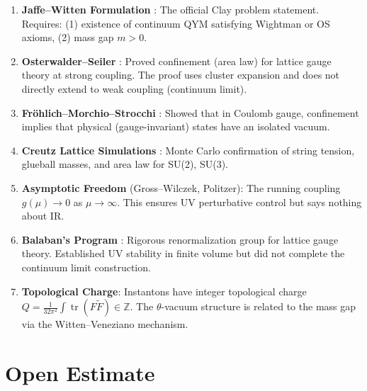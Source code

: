 \documentclass[11pt]{article}
\theoremstyle{definition}
\DeclareMathOperator{\tr}{tr}
\begin{document}
\begin{enumerate}
  \item \textbf{Jaffe--Witten Formulation} \cite{JW}: The official Clay problem statement.
    Requires: (1) existence of continuum QYM satisfying Wightman or OS axioms,
    (2) mass gap $m > 0$.

  \item \textbf{Osterwalder--Seiler} \cite{OS}: Proved confinement (area law)
    for lattice gauge theory at strong coupling.  The proof uses cluster expansion
    and does not directly extend to weak coupling (continuum limit).

  \item \textbf{Fr\"ohlich--Morchio--Strocchi} \cite{FMS}: Showed that in
    Coulomb gauge, confinement implies that physical (gauge-invariant) states
    have an isolated vacuum.

  \item \textbf{Creutz Lattice Simulations} \cite{Creutz}: Monte Carlo confirmation
    of string tension, glueball masses, and area law for SU(2), SU(3).

  \item \textbf{Asymptotic Freedom} (Gross--Wilczek, Politzer):
    The running coupling $g(\mu) \to 0$ as $\mu \to \infty$.
    This ensures UV perturbative control but says nothing about IR.

  \item \textbf{Balaban's Program} \cite{Balaban}: Rigorous renormalization group
    for lattice gauge theory.  Established UV stability in finite volume
    but did not complete the continuum limit construction.

  \item \textbf{Topological Charge}: Instantons have integer topological charge
    $Q = \frac{1}{32\pi^2} \int \tr(F \tilde{F}) \in \mathbb{Z}$.
    The $\theta$-vacuum structure is related to the mass gap via the
    Witten--Veneziano mechanism.
\end{enumerate}

\section{Open Estimate}
\end{document}

